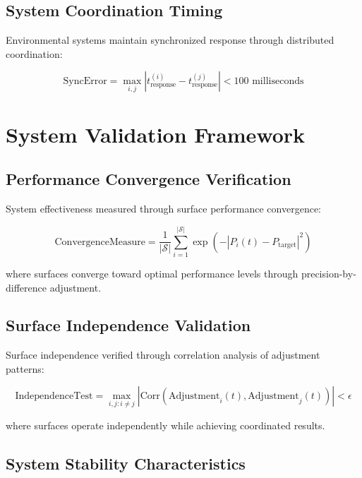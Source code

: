 \documentclass[12pt,a4paper]{article}
\begin{document}
\subsection{System Coordination Timing}

Environmental systems maintain synchronized response through distributed coordination:

\begin{equation}
\text{SyncError} = \max_{i,j} |t_{\text{response}}^{(i)} - t_{\text{response}}^{(j)}| < 100 \text{ milliseconds}
\end{equation}

\section{System Validation Framework}

\subsection{Performance Convergence Verification}

System effectiveness measured through surface performance convergence:

\begin{equation}
\text{ConvergenceMeasure} = \frac{1}{|\mathcal{S}|} \sum_{i=1}^{|\mathcal{S}|} \exp\left(-|P_i(t) - P_{\text{target}}|^2\right)
\end{equation}

where surfaces converge toward optimal performance levels through precision-by-difference adjustment.

\subsection{Surface Independence Validation}

Surface independence verified through correlation analysis of adjustment patterns:

\begin{equation}
\text{IndependenceTest} = \max_{i,j: i \neq j} |\text{Corr}(\text{Adjustment}_i(t), \text{Adjustment}_j(t))| < \epsilon
\end{equation}

where surfaces operate independently while achieving coordinated results.

\subsection{System Stability Characteristics}
\end{document}
